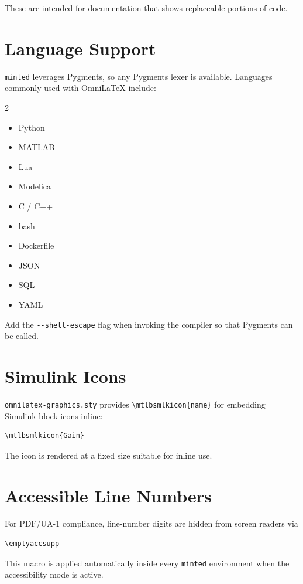 These are intended for documentation that shows replaceable portions of
code.

\section{Language Support}

\texttt{minted} leverages Pygments, so any Pygments lexer is available.
Languages commonly used with OmniLaTeX include:

\begin{multicols}{2}
\begin{itemize}
    \item Python
    \item MATLAB
    \item Lua
    \item Modelica
    \item C / C++
    \item bash
    \item Dockerfile
    \item JSON
    \item SQL
    \item YAML
\end{itemize}
\end{multicols}

Add the \texttt{-{}-shell-escape} flag when invoking the compiler so that
Pygments can be called.

\section{Simulink Icons}

\texttt{omnilatex-graphics.sty} provides \verb|\mtlbsmlkicon{name}| for
embedding Simulink block icons inline:

\begin{verbatim}
\mtlbsmlkicon{Gain}
\end{verbatim}

The icon is rendered at a fixed size suitable for inline use.

\section{Accessible Line Numbers}

For PDF/UA-1 compliance, line-number digits are hidden from screen readers
via

\begin{verbatim}
\emptyaccsupp
\end{verbatim}

This macro is applied automatically inside every \texttt{minted}
environment when the accessibility mode is active.
